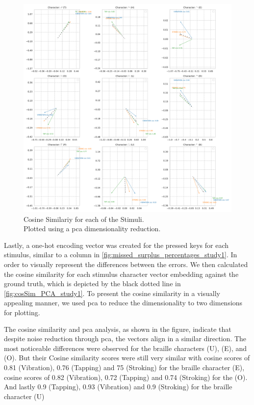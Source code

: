 \begin{figure}
    \centering
    \includegraphics[width=\linewidth]{src/pictures/Study1Data_Experiment/Vectors_study1.pdf}
    \caption{Cosine Similariy for each of the Stimuli.\\Plotted using a \gls{pca} dimensionality reduction.}
    \label{fig:cosSim_PCA_study1}
\end{figure}

Lastly, a one-hot encoding vector was created for the pressed keys for each stimulus, similar to a column in \autoref{fig:missed_surplus_percentages_study1}. 
In order to visually represent the differences between the errors.
We then calculated the cosine similarity for each stimulus character vector embedding against the ground truth, which is depicted by the black dotted line in \autoref{fig:cosSim_PCA_study1}.
To present the cosine similarity in a visually appealing manner, we used \gls{pca} to reduce the dimensionality to two dimensions for plotting.

The cosine similarity and \gls{pca} analysis, as shown in the figure, indicate that despite noise reduction through \gls{pca}, the vectors align in a similar direction. The most noticeable differences were observed for the braille characters (U), (E), and (O).
But their Cosine similarity scores were still very similar with cosine scores of 0.81 (Vibration), 0.76 (Tapping) and 75 (Stroking) for the braille  character (E), cosine scores of 0.82 (Vibration), 0.72 (Tapping) and 0.74 (Stroking) for the (O).
And lastly 0.9 (Tapping), 0.93 (Vibration) and 0.9 (Stroking) for the braille character (U)




